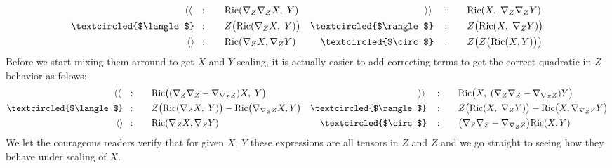 \documentclass[a4paper,11pt]{article}
\numberwithin{equation}{section}
\theoremstyle{definition}
\newcommand{\R}{{\mathrm{Ric}}}
\begin{document}
\begin{align*}
    \langle\langle \quad:\quad&\quad
    \R(\nabla_Z\nabla_Z X,\;Y)
    &\rangle\rangle \quad:\quad&\quad
    \R(X,\;\nabla_Z\nabla_ZY)\\
    \textcircled{$\langle$}\!\!\! \quad:\quad&\quad
    Z\big(\R(\nabla_Z X,\;Y)\big)
    &\textcircled{$\rangle$}\! \quad:\quad&\quad
    Z\big(\R( X,\;\nabla_ZY)\big)\\
    \langle\rangle \!\!\!\quad:\quad&\quad
    \R(\nabla_Z X, \nabla_Z Y)
    & \textcircled{$\circ$}\! \quad:\quad&\quad
    Z\big(Z\big(\R(X,Y)\big)\big)
\end{align*}
Before we start mixing them arround to get $X$ and $Y$ scaling, it is actually easier to add correcting terms to get the correct quadratic in $Z$ behavior as folows:
\begin{align*}
    \langle\langle \quad:\quad&\quad
    \R\big((\nabla_Z\nabla_Z-\nabla_{\nabla_Z Z}) X,\;Y\big)
    &\rangle\rangle \quad:\quad&\quad
    \R\big(X,\;(\nabla_Z\nabla_Z-\nabla_{\nabla_Z Z})Y\big)\\
    \textcircled{$\langle$}\!\!\! \quad:\quad&\quad
    Z\big(\R(\nabla_Z X,\;Y)\big) - \R\big(\nabla_{\nabla_ZZ}X,Y\big)
    &\textcircled{$\rangle$}\! \quad:\quad&\quad
    Z\big(\R( X,\;\nabla_ZY)\big)- \R\big(X,\nabla_{\nabla_ZZ}Y\big)\\
    \langle\rangle \!\!\!\quad:\quad&\quad
    \R(\nabla_Z X, \nabla_Z Y)
    & \textcircled{$\circ$}\! \quad:\quad&\quad
    \big(\nabla_Z\nabla_Z-\nabla_{\nabla_Z Z}\big)\R(X,Y)
\end{align*}
We let the courageous readers verify that for given $X$, $Y$ these expressions are all tensors in $Z$ and $Z$ and we go straight to seeing how they behave under scaling of $X$.
\end{document}
